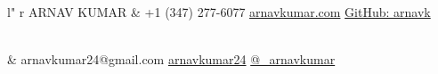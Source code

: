 \documentclass[11pt, letter]{article}
\begin{document}
%
\begin{adjustbox}{width=1.03\textwidth,center}
\begin{tabular}{ l" r }
  {
    {\titlefont\fontsize{35pt}{22pt}\selectfont
      ARNAV KUMAR
    }
  }
&
\faMobilePhone { }+1 (347) 277-6077 \textbullet{}
\faExternalLink { }\href{http://arnavkumar.com}{arnavkumar.com} \textbullet{}
\faGithub { }\href{https://github.com/arnavk}{GitHub: arnavk}

\\
&
\faEnvelope { }arnavkumar24@gmail.com \textbullet{}
\faLinkedin { }\href{http://sg.linkedin.com/in/arnavkumar24/}{arnavkumar24} \textbullet{}
\faTwitter { }\href{http://twitter.com/\_arnavkumar}{@\_arnavkumar}
\\
\end{tabular}
\end{adjustbox}

\begin{raggedright}
\vspace{5mm}


\end{raggedright}
\end{document}

